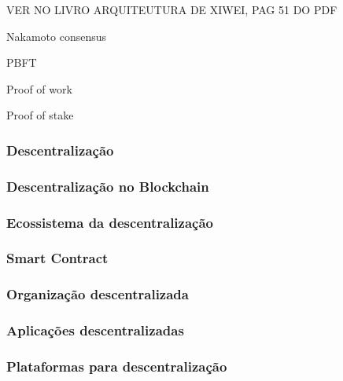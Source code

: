             VER NO LIVRO ARQUITEUTURA DE XIWEI, PAG 51 DO PDF
            
            Nakamoto consensus
            
            PBFT \cite{beginnig_blockchain_bikramaditya} 
            
            Proof of work
            
            Proof of stake
    
    
    \subsubsection{Descentralização}

        \subsubsection{Descentralização no Blockchain}

        \subsubsection{Ecossistema da descentralização}

        \subsubsection{Smart Contract}

        \subsubsection{Organização descentralizada}

        \subsubsection{Aplicações descentralizadas}

        \subsubsection{Plataformas para descentralização}
        

        \cite{bitcoin_and_blockchainsecurity}
